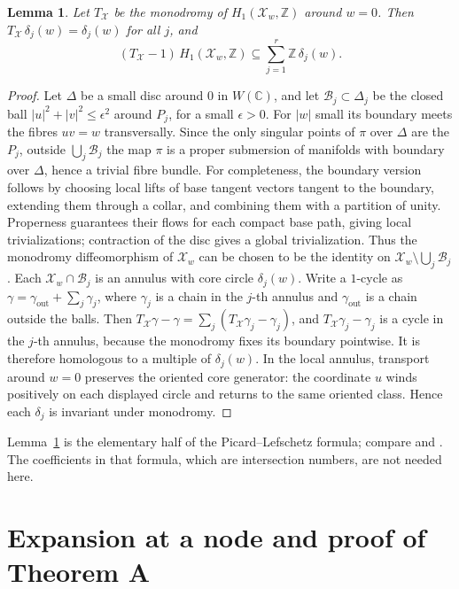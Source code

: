 \documentclass[11pt]{amsart}
\newtheorem{lemma}[theorem]{Lemma}
\theoremstyle{definition}
\theoremstyle{remark}
\numberwithin{equation}{section}
\newcommand{\Z}{\mathbb{Z}}
\newcommand{\C}{\mathbb{C}}
\newcommand{\cX}{\mathcal{X}}
\newcommand{\cB}{\mathcal{B}}
\begin{document}
\begin{lemma}\label{lem:variation}
Let $T_{\cX}$ be the monodromy of $H_1(\cX_w,\Z)$ around $w=0$. Then $T_{\cX}\,\delta_j(w)=\delta_j(w)$ for all $j$, and
\[
(T_{\cX}-1)\,H_1(\cX_w,\Z)\subseteq\sum_{j=1}^r\Z\,\delta_j(w).
\]
\end{lemma}

\begin{proof}
Let $\Delta$ be a small disc around $0$ in $W(\C)$, and let $\cB_j\subset\Delta_j$ be the closed ball $|u|^2+|v|^2\le\epsilon^2$ around $P_j$, for a small $\epsilon>0$. For $|w|$ small its boundary meets the fibres $uv=w$ transversally. Since the only singular points of $\pi$ over $\Delta$ are the $P_j$, outside $\bigcup_j\cB_j$ the map $\pi$ is a proper submersion of manifolds with boundary over $\Delta$, hence a trivial fibre bundle. For completeness, the boundary version follows by choosing local lifts of base tangent vectors tangent to the boundary, extending them through a collar, and combining them with a partition of unity. Properness guarantees their flows for each compact base path, giving local trivializations; contraction of the disc gives a global trivialization. Thus the monodromy diffeomorphism of $\cX_w$ can be chosen to be the identity on $\cX_w\setminus\bigcup_j\cB_j$. Each $\cX_w\cap\cB_j$ is an annulus with core circle $\delta_j(w)$. Write a $1$-cycle as $\gamma=\gamma_{\mathrm{out}}+\sum_j\gamma_j$, where $\gamma_j$ is a chain in the $j$-th annulus and $\gamma_{\mathrm{out}}$ is a chain outside the balls. Then $T_{\cX}\gamma-\gamma=\sum_j(T_{\cX}\gamma_j-\gamma_j)$, and $T_{\cX}\gamma_j-\gamma_j$ is a cycle in the $j$-th annulus, because the monodromy fixes its boundary pointwise. It is therefore homologous to a multiple of $\delta_j(w)$. In the local annulus, transport around $w=0$ preserves the oriented core generator: the coordinate $u$ winds positively on each displayed circle and returns to the same oriented class. Hence each $\delta_j$ is invariant under monodromy.
\end{proof}

Lemma~\ref{lem:variation} is the elementary half of the Picard--Lefschetz formula; compare \citet[Exp.~XV]{DeligneKatz1973} and \citet{Clemens1977}. The coefficients in that formula, which are intersection numbers, are not needed here.

\section{Expansion at a node and proof of Theorem A}\label{sec:node}
\end{document}
